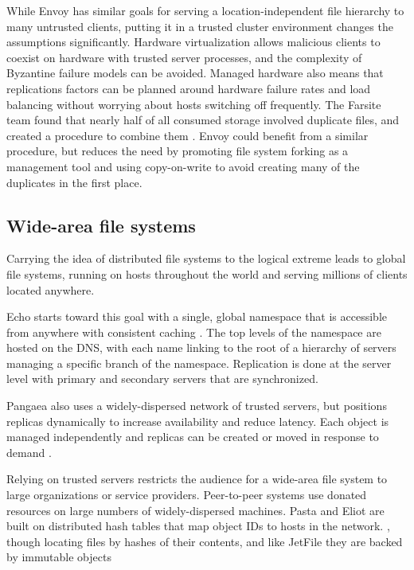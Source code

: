 While Envoy has similar goals for serving a location-independent file hierarchy to many untrusted clients, putting it in a trusted cluster environment changes the assumptions significantly. Hardware virtualization allows malicious clients to coexist on hardware with trusted server processes, and the complexity of Byzantine failure models can be avoided. Managed hardware also means that replications factors can be planned around hardware failure rates and load balancing without worrying about hosts switching off frequently. The Farsite team found that nearly half of all consumed storage involved duplicate files, and created a procedure to combine them \cite{douceur02}. Envoy could benefit from a similar procedure, but reduces the need by promoting file system forking as a management tool and using copy-on-write to avoid creating many of the duplicates in the first place.

\subsection{Wide-area file systems}

Carrying the idea of distributed file systems to the logical extreme leads to global file systems, running on hosts throughout the world and serving millions of clients located anywhere.

Echo starts toward this goal with a single, global namespace that is accessible from anywhere with consistent caching \cite{birrell93,mann}. The top levels of the namespace are hosted on the DNS, with each name linking to the root of a hierarchy of servers managing a specific branch of the namespace. Replication is done at the server level with primary and secondary servers that are synchronized.

Pangaea \cite{saito02b} also uses a widely-dispersed network of trusted servers, but positions replicas dynamically to increase availability and reduce latency. Each object is managed independently and replicas can be created or moved in response to demand \cite{saito02a}.

Relying on trusted servers restricts the audience for a wide-area file system to large organizations or service providers. Peer-to-peer systems use donated resources on large numbers of widely-dispersed machines. Pasta \cite{moreton} and Eliot \cite{stein02} are built on distributed hash tables that map object IDs to hosts in the network. , though locating files by hashes of their contents, and like JetFile \cite{gronvall} they are backed by immutable objects

